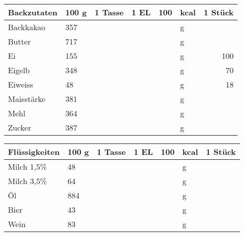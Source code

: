 \vfill

\begin{tabularx}{\linewidth}{X|l|r|r|rl|r}
Backzutaten       &   100 g & 1 Tasse & 1 EL &      100 & kcal    & 1 Stück  \\
\hline
Backkakao         &     357 &         &      &          & g       &          \\
Butter            &     717 &         &      &          & g       &          \\
Ei                &     155 &         &      &          & g       &     100  \\
Eigelb            &     348 &         &      &          & g       &      70  \\
Eiweiss           &      48 &         &      &          & g       &      18  \\
Maisstärke        &     381 &         &      &          & g       &          \\
Mehl              &     364 &         &      &          & g       &          \\
Zucker            &     387 &         &      &          & g       &          \\
\end{tabularx}

\vfill

\begin{tabularx}{\linewidth}{X|l|r|r|rl|r}
Flüssigkeiten     &   100 g & 1 Tasse & 1 EL &      100 & kcal    & 1 Stück  \\
\hline
Milch 1,5\%       &      48 &         &      &          & g       &          \\
Milch 3,5\%       &      64 &         &      &          & g       &          \\
Öl                &     884 &         &      &          & g       &          \\
Bier              &      43 &         &      &          & g       &          \\
Wein              &      83 &         &      &          & g       &          \\
\end{tabularx}
